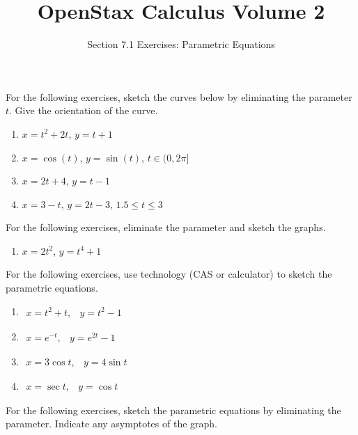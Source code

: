 \documentclass{exercises}
\title{OpenStax Calculus Volume 2}
\subtitle{Section 7.1 Exercises: Parametric Equations}
\author{}
\date{}
\begin{document}
\maketitle


For the following exercises, sketch the curves below by eliminating the parameter $t$. Give the orientation of the curve.

\begin{enumerate}[start=1]
\item $x=t^{2}+2t$, $y=t+1$
\item $x=\cos(t)$, $y=\sin(t)$, $t\in(0,2\pi]$
\item $x=2t+4$, $y=t-1$
\item $x=3-t$, $y=2t-3$, $1.5\le t\le 3$
\end{enumerate}

For the following exercises, eliminate the parameter and sketch the graphs.

\begin{enumerate}[resume]
\item $x=2t^{2}$, $y=t^{4}+1$
\end{enumerate}

For the following exercises, use technology (CAS or calculator) to sketch the parametric equations.

\begin{enumerate}[resume]
\item \techrequired $\begin{matrix}x=t^{2}+t, & y=t^{2}-1\end{matrix}$
\item \techrequired $\begin{matrix}x=e^{-t}, & y=e^{2t}-1\end{matrix}$
\item \techrequired $\begin{matrix}x=3\cos t, & y=4\sin t\end{matrix}$
\item \techrequired $\begin{matrix}x=\sec t, & y=\cos t\end{matrix}$
\end{enumerate}

For the following exercises, sketch the parametric equations by eliminating the parameter. Indicate any asymptotes of the graph.
\end{document}
